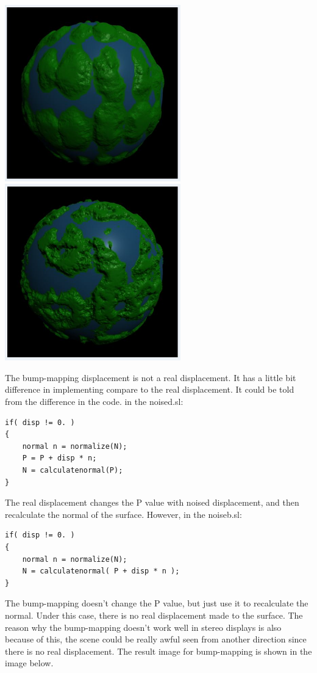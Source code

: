 \documentclass[letterpaper,14pt,titlepage,fleqn]{article}
\begin{document}
\begin{center}
	\includegraphics[width=3in]{disp_mag_01.jpg}
	\includegraphics*[width=3in]{disp_mag_03.jpg}
\end{center}
The bump-mapping displacement is not a real displacement. It has a little bit difference in implementing compare to the real displacement. It could be told from the difference in the code. in the noised.sl:
\\
\begin{lstlisting}
if( disp != 0. )
{
	normal n = normalize(N);
	P = P + disp * n;
	N = calculatenormal(P);
}
\end{lstlisting}
The real displacement changes the P value with noised displacement, and then recalculate the normal of the surface. However, in the noiseb.sl:
\\
\begin{lstlisting}
if( disp != 0. )
{
	normal n = normalize(N);
	N = calculatenormal( P + disp * n );
}
\end{lstlisting}
The bump-mapping doesn't change the P value, but just use it to recalculate the normal. Under this case, there is no real displacement made to the surface. The reason why the bump-mapping doesn't work well in stereo displays is also because of this, the scene could be really awful seen from another direction since there is no real displacement. The result image for bump-mapping is shown in the image below.
\end{document}
